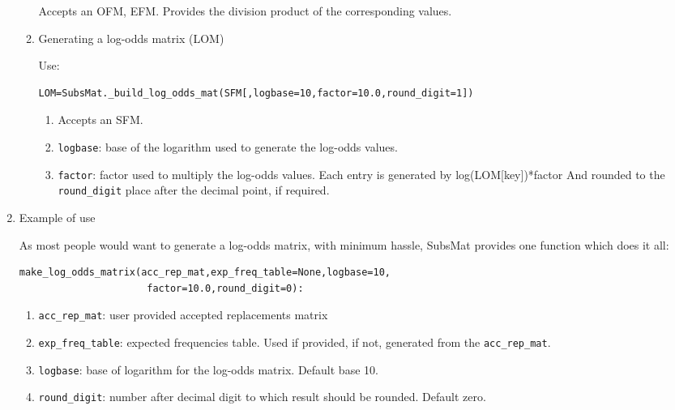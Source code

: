 \documentclass{report}
\begin{document}
\begin{enumerate}
\begin{enumerate}
  Accepts an OFM, EFM. Provides the division product of the corresponding values. 

\item Generating a log-odds matrix (LOM)

   Use: 
\begin{verbatim}
LOM=SubsMat._build_log_odds_mat(SFM[,logbase=10,factor=10.0,round_digit=1])
\end{verbatim}

   \begin{enumerate}
     \item Accepts an SFM. 

     \item \verb|logbase|: base of the logarithm used to generate the log-odds values. 

     \item \verb|factor|: factor used to multiply the log-odds values.  Each entry is generated by log(LOM[key])*factor And rounded to the \verb|round_digit| place after the decimal point, if required.

\end{enumerate}

\end{enumerate}

\item Example of use

As most people would want to generate a log-odds matrix, with minimum hassle, SubsMat provides one function which does it all:


\begin{verbatim} 
make_log_odds_matrix(acc_rep_mat,exp_freq_table=None,logbase=10,
                      factor=10.0,round_digit=0):
\end{verbatim}

\begin{enumerate}
  \item \verb|acc_rep_mat|: user provided accepted replacements matrix
  \item \verb|exp_freq_table|: expected frequencies table. Used if provided, if not, generated from the \verb|acc_rep_mat|.
  \item \verb|logbase|: base of logarithm for the log-odds matrix. Default base 10.
  \item \verb|round_digit|: number after decimal digit to which result should be rounded. Default zero.
\end{enumerate}

\end{enumerate}
\end{document}
